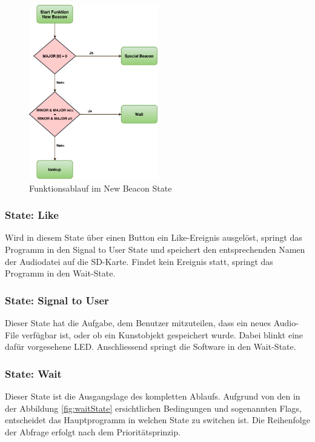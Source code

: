 \begin{figure}[htbp!!!!]
	\centering
	\includegraphics[width=0.5\textwidth]{Data/NewBeacon_picture.pdf}
	\caption[Statemachine: New Beacon]{Funktionsablauf im New Beacon State}
	\label{fig:newBeaconState}
\end{figure} 

\subsubsection*{State: Like}

Wird in diesem State über einen Button ein Like-Ereignis ausgelöst, springt das Programm in den Signal to User State und speichert den entsprechenden Namen der Audiodatei auf die SD-Karte. Findet kein Ereignis statt, springt das Programm in den Wait-State.

\subsubsection*{State: Signal to User}

Dieser State hat die Aufgabe, dem Benutzer mitzuteilen, dass ein neues Audio-File verfügbar ist, oder ob ein Kunstobjekt gespeichert wurde. Dabei blinkt eine dafür vorgesehene LED. Anschliessend springt die Software in den Wait-State.

\subsubsection*{State: Wait}

Dieser State ist die Ausgangslage des kompletten Ablaufs. Aufgrund von den in der Abbildung \ref{fig:waitState} ersichtlichen Bedingungen und sogenannten Flags, entscheidet das Hauptprogramm in welchen State zu switchen ist. Die Reihenfolge der Abfrage erfolgt nach dem Prioritätsprinzip.

